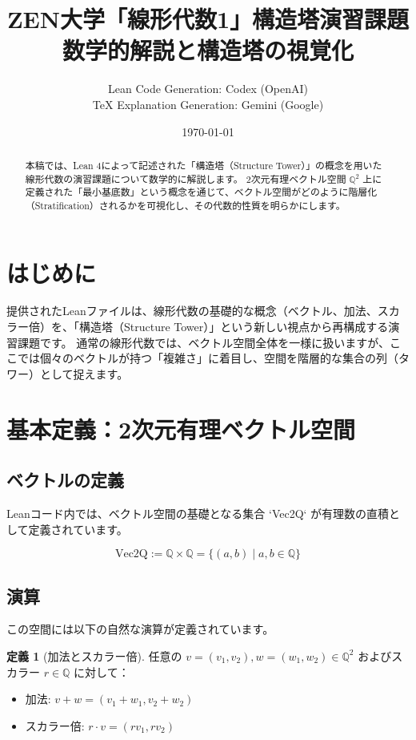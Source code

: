 \documentclass[judge=standard,11pt]{jlreq}
\title{ZEN大学「線形代数1」構造塔演習課題\\ 数学的解説と構造塔の視覚化}
\author{Lean Code Generation: Codex (OpenAI) \\ TeX Explanation Generation: Gemini (Google)}
\date{\today}
\theoremstyle{definition}
\newtheorem{definition}{定義}[section]
\newcommand{\Q}{\mathbb{Q}}
\newcommand{\VecQ}{\Q^2}
\begin{document}
\maketitle

\begin{abstract}
本稿では、Lean 4によって記述された「構造塔（Structure Tower）」の概念を用いた線形代数の演習課題について数学的に解説します。
2次元有理ベクトル空間 $\Q^2$ 上に定義された「最小基底数」という概念を通じて、ベクトル空間がどのように階層化（Stratification）されるかを可視化し、その代数的性質を明らかにします。
\end{abstract}

\tableofcontents

\section{はじめに}
提供されたLeanファイルは、線形代数の基礎的な概念（ベクトル、加法、スカラー倍）を、「構造塔（Structure Tower）」という新しい視点から再構成する演習課題です。
通常の線形代数では、ベクトル空間全体を一様に扱いますが、ここでは個々のベクトルが持つ「複雑さ」に着目し、空間を階層的な集合の列（タワー）として捉えます。

\section{基本定義：2次元有理ベクトル空間}

\subsection{ベクトルの定義}
Leanコード内では、ベクトル空間の基礎となる集合 `Vec2Q` が有理数の直積として定義されています。

\[ \text{Vec2Q} := \Q \times \Q = \{ (a, b) \mid a, b \in \Q \} \]

\subsection{演算}
この空間には以下の自然な演算が定義されています。

\begin{definition}[加法とスカラー倍]
任意の $v = (v_1, v_2), w = (w_1, w_2) \in \VecQ$ およびスカラー $r \in \Q$ に対して：
\begin{itemize}
    \item 加法: $v + w = (v_1 + w_1, v_2 + w_2)$
    \item スカラー倍: $r \cdot v = (r v_1, r v_2)$
\end{itemize}
\end{definition}
\end{document}
